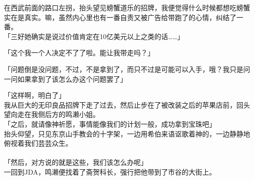 在西武前面的路口左拐，抬头望见螃蟹道乐的招牌，我便觉得什么时候都想吃螃蟹实在是真实。嘛，虽然内心里也有一番自责又被广告给带跑了的心情，纠结了一番。\\

「三好她确实是说过价值肯定在10亿美元以上之类的话……」

「这个我一个人决定不了了啦。能让我带走吗？」

「问题倒是没问题，不过，不是拿到了，而只不过是可能可以入手，哦？我只是问一问如果拿到了该怎么办这个问题罢了」

「这样啊，明白了」\\

我从巨大的无印良品招牌下走了过去，然后止步在了被改装之后的苹果店前，回头望向走在我侧后方的鸣濑小姐。\\

「之后，就请像神祈愿，事情能像我们的计划一般，成功拿到宝珠吧」\\

抬头仰望，只见东京山手教会的十字架，一边用希伯来语讴歌着神的，一边静静地俯视着我们芸芸众生。\\

\sqsplit\\

「然后，对方说的就是这些，我们该怎么办呢」\\

一回到JDA，鸣濑便找着了斋贺科长，强行把他带到了市谷的大街上。

